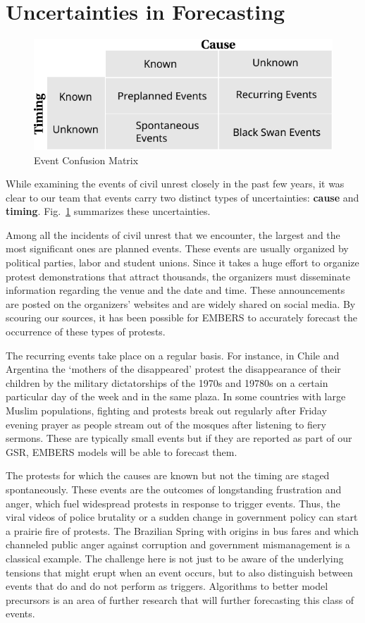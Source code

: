 \section{Uncertainties in Forecasting}
\begin{figure}
\includegraphics[width=\columnwidth]{figures/cu/event_confusionMatrix}
\caption{Event Confusion Matrix}
\label{rumsfeld}
\end{figure}

While examining the events of civil unrest closely
in the past few years, it was clear to our
team that events carry two distinct types of uncertainties: {\bf cause}
and {\bf timing}.
Fig.~\ref{rumsfeld} summarizes these uncertainties.

Among all the incidents of civil unrest that we encounter, the largest and the most significant ones
are planned events.  These events are usually organized by political parties, labor and student unions.
Since it takes a huge effort to organize protest demonstrations that
attract thousands, the organizers must disseminate information regarding the venue
and the date and time.  These announcements are posted on the organizers’ websites and
are widely shared on social media.  By scouring our sources,
it has been possible for EMBERS to accurately forecast the occurrence of these types of protests.

The recurring events take place on a regular basis.  For instance, in Chile and Argentina the
`mothers of the disappeared' protest the disappearance of their children by the military dictatorships
of the 1970s and 19780s on a certain particular day of the week and in the same plaza.
In some countries with large Muslim populations, fighting and protests break out regularly after
Friday evening prayer as people stream out of the mosques after listening
to fiery sermons. These are typically small events but if they are reported as part of our GSR,
EMBERS models will be able to forecast them.

The protests for which the causes are known but not the timing are staged spontaneously.  These
events are the outcomes of longstanding frustration and anger, which fuel widespread
protests in response to trigger events.  Thus, the viral videos of police brutality or
a sudden change in government policy can start a prairie fire of protests.  The Brazilian
Spring with origins in bus fares and which channeled
public anger against corruption and government mismanagement is a classical example. The challenge here
is not just to be aware of the underlying tensions that might erupt when an event occurs, but to also
distinguish between events that do and do not perform as triggers. Algorithms to better model
precursors is an area of further research that will further forecasting this class of events.

